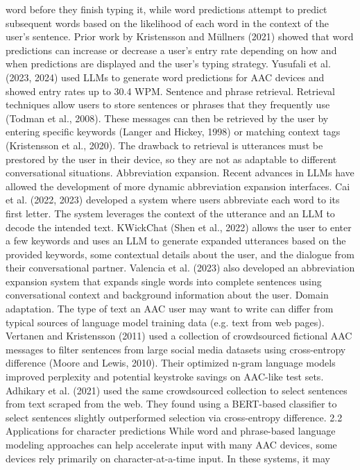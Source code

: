 word before they finish typing it, while word predictions attempt to predict subsequent words based
on the likelihood of each word in the context of
the user’s sentence. Prior work by Kristensson and
Müllners (2021) showed that word predictions can
increase or decrease a user’s entry rate depending
on how and when predictions are displayed and the
user’s typing strategy. Yusufali et al. (2023, 2024)
used LLMs to generate word predictions for AAC
devices and showed entry rates up to 30.4 WPM.
Sentence and phrase retrieval. Retrieval techniques allow users to store sentences or phrases that
they frequently use (Todman et al., 2008). These
messages can then be retrieved by the user by entering specific keywords (Langer and Hickey, 1998)
or matching context tags (Kristensson et al., 2020).
The drawback to retrieval is utterances must be prestored by the user in their device, so they are not as
adaptable to different conversational situations.
Abbreviation expansion. Recent advances in
LLMs have allowed the development of more dynamic abbreviation expansion interfaces. Cai et al.
(2022, 2023) developed a system where users abbreviate each word to its first letter. The system
leverages the context of the utterance and an LLM
to decode the intended text. KWickChat (Shen
et al., 2022) allows the user to enter a few keywords and uses an LLM to generate expanded utterances based on the provided keywords, some
contextual details about the user, and the dialogue
from their conversational partner. Valencia et al.
(2023) also developed an abbreviation expansion
system that expands single words into complete
sentences using conversational context and background information about the user.
Domain adaptation. The type of text an AAC
user may want to write can differ from typical
sources of language model training data (e.g. text
from web pages). Vertanen and Kristensson (2011)
used a collection of crowdsourced fictional AAC
messages to filter sentences from large social media datasets using cross-entropy difference (Moore
and Lewis, 2010). Their optimized n-gram language models improved perplexity and potential
keystroke savings on AAC-like test sets. Adhikary
et al. (2021) used the same crowdsourced collection to select sentences from text scraped from the
web. They found using a BERT-based classifier
to select sentences slightly outperformed selection
via cross-entropy difference.
2.2 Applications for character predictions
While word and phrase-based language modeling
approaches can help accelerate input with many
AAC devices, some devices rely primarily on
character-at-a-time input. In these systems, it may
